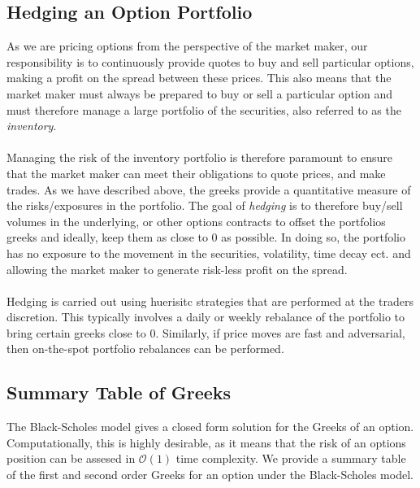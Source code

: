 \documentclass{article}
\begin{document}
\subsection{Hedging an Option Portfolio}
As we  are pricing options from the perspective of the market maker, our responsibility is to continuously provide quotes to buy and sell particular options, making a profit on the spread between these prices. This also means that the market maker must always be prepared to buy or sell a particular option and must therefore manage a large portfolio of the securities, also referred to as the \textit{inventory}. \\
\\
Managing the risk of the inventory portfolio is therefore paramount to ensure that the market maker can meet their obligations to quote prices, and make trades. As we have described above, the greeks provide a quantitative measure of the risks/exposures in the portfolio. The goal of \textit{hedging} is to therefore buy/sell volumes in the underlying, or other options contracts to offset the portfolios greeks and ideally, keep them as close to 0 as possible. In doing so, the portfolio has no exposure to the movement in the securities, volatility, time decay ect. and allowing the market maker to generate risk-less profit on the spread.  \\
\\
Hedging is carried out using huerisitc strategies that are performed at the traders discretion. This typically involves a daily or weekly rebalance of the portfolio to bring certain greeks close to 0. Similarly, if price moves are fast and adversarial, then on-the-spot portfolio rebalances can be performed. 

\subsection{Summary Table of Greeks}
The Black-Scholes model gives a closed form solution for the Greeks of an option. Computationally, this is highly desirable, as it means that the risk of an options position can be assesed in $\mathcal{O}(1)$ time complexity. We provide a summary table of the first and second order Greeks for an option under the Black-Scholes model. 

\newpage
\end{document}
